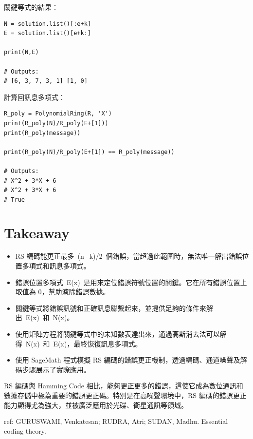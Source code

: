 \documentclass[
]{article}
\begin{document}
關鍵等式的結果：

\begin{verbatim}
N = solution.list()[:e+k]
E = solution.list()[e+k:]

print(N,E)

# Outputs:
# [6, 3, 7, 3, 1] [1, 0]
\end{verbatim}

計算回訊息多項式：

\begin{verbatim}
R_poly = PolynomialRing(R, 'X')
print(R_poly(N)/R_poly(E+[1]))
print(R_poly(message))

print(R_poly(N)/R_poly(E+[1]) == R_poly(message))

# Outputs:
# X^2 + 3*X + 6
# X^2 + 3*X + 6
# True
\end{verbatim}

\hypertarget{takeaway}{%
\section{Takeaway}\label{takeaway}}

\begin{itemize}
\item
  RS
  編碼能更正最多~(n−k)/2\hspace{0pt}~個錯誤，當超過此範圍時，無法唯一解出錯誤位置多項式和訊息多項式。
\item
  錯誤位置多項式~E(x)~是用來定位錯誤符號位置的關鍵。它在所有錯誤位置上取值為
  0，幫助濾除錯誤數據。
\item
  關鍵等式將錯誤訊號和正確訊息聯繫起來，並提供足夠的條件來解出~E(x)~和~N(x)。
\item
  使用矩陣方程將關鍵等式中的未知數表達出來，通過高斯消去法可以解得~N(x)~和~E(x)，最終恢復訊息多項式。
\item
  使用 SageMath 程式模擬 RS
  編碼的錯誤更正機制，透過編碼、通道噪聲及解碼步驟展示了實際應用。
\end{itemize}

RS 編碼與 Hamming Code
相比，能夠更正更多的錯誤，這使它成為數位通訊和數據存儲中極為重要的錯誤更正碼。特別是在高噪聲環境中，RS
編碼的錯誤更正能力顯得尤為強大，並被廣泛應用於光碟、衛星通訊等領域。

ref: GURUSWAMI, Venkatesan; RUDRA, Atri; SUDAN, Madhu. Essential coding
theory.
\end{document}
